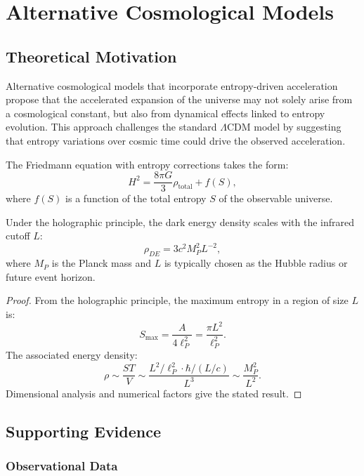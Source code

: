 \section{Alternative Cosmological Models}

\subsection{Theoretical Motivation}

Alternative cosmological models that incorporate entropy-driven acceleration propose that the accelerated expansion of the universe may not solely arise from a cosmological constant, but also from dynamical effects linked to entropy evolution. This approach challenges the standard $\Lambda$CDM model by suggesting that entropy variations over cosmic time could drive the observed acceleration.

\begin{definition}
The Friedmann equation with entropy corrections takes the form:
\[
H^2 = \frac{8\pi G}{3}\rho_{\text{total}} + f(S),
\]
where $f(S)$ is a function of the total entropy $S$ of the observable universe.
\end{definition}

\begin{theorem}
Under the holographic principle, the dark energy density scales with the infrared cutoff $L$:
\[
\rho_{DE} = 3c^2M_P^2 L^{-2},
\]
where $M_P$ is the Planck mass and $L$ is typically chosen as the Hubble radius or future event horizon.
\end{theorem}

\begin{proof}
From the holographic principle, the maximum entropy in a region of size $L$ is:
\[
S_{\max} = \frac{A}{4\ell_P^2} = \frac{\pi L^2}{\ell_P^2}.
\]
The associated energy density:
\[
\rho \sim \frac{S T}{V} \sim \frac{L^2/\ell_P^2 \cdot \hbar/(L/c)}{L^3} \sim \frac{M_P^2}{L^2}.
\]
Dimensional analysis and numerical factors give the stated result.
\end{proof}

\subsection{Supporting Evidence}

\subsubsection{Observational Data}

